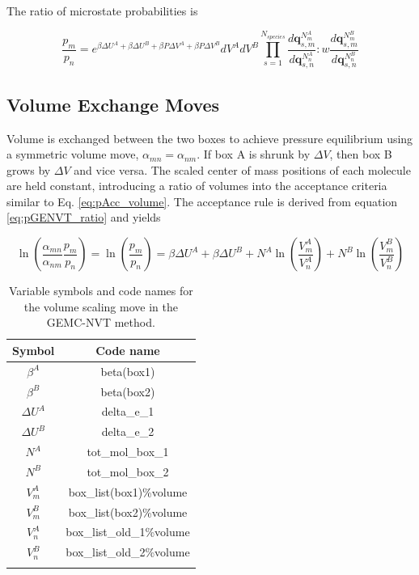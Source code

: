 The ratio of microstate probabilities is

\begin{equation}
\frac{p_m}{p_n} = e^{\beta \Delta U^A + \beta \Delta U^B + \beta P \Delta V^A + \beta P \Delta V^B} dV^A dV^B
                  \prod_{s=1}^{N_{species}} \frac{d\mathbf{q}_{s,m}^{N^A_m}}{d\mathbf{q}_{s,n}^{N^A_n}}
                   :w
                         \frac{d\mathbf{q}_{s,m}^{N^B_m}}{d\mathbf{q}_{s,n}^{N^B_n}}
\label{eq:pGENPT_ratio}
\end{equation}

\subsection{Volume Exchange Moves} 
\label{sec:vol_swap}

Volume is exchanged between the two boxes to achieve pressure equilibrium using a symmetric volume move, $\alpha_{mn} = \alpha_{nm}$.
If box A is shrunk by $\Delta V$, then box B grows by $\Delta V$ and vice versa.
The scaled center of mass positions of each molecule are held constant, 
introducing a ratio of volumes into the acceptance criteria similar to Eq. \ref{eq:pAcc_volume}.
The acceptance rule is derived from equation \ref{eq:pGENVT_ratio} and yields

\begin{equation}
\ln \left( \frac{\alpha_{mn}}{\alpha_{nm}} \frac{p_m}{p_n} \right) = \ln \left( \frac{p_m}{p_n} \right) = \beta \Delta U^A + \beta \Delta U^B + N^A \ln\left(\frac{V^A_m}{V^A_n}\right) + N^B \ln\left(\frac{V^B_m}{V^B_n}\right)
\label{eq:pAcc_vol_swap}
\end{equation}

\begin{table}
\caption{Variable symbols and code names for the volume scaling move in the GEMC-NVT method.}
\label{table:gemc_nvt_volume}
\centering
\begin{tabular}{|c|c|} \hline
 {\bf Symbol} & {\bf Code name} \\ \hline
 $\beta^A$ & beta(box1) \\
 $\beta^B$ & beta(box2) \\
 $\Delta U^A$ & delta\_e\_1 \\
 $\Delta U^B$ & delta\_e\_2 \\
 $N^A$ & tot\_mol\_box\_1 \\
 $N^B$ & tot\_mol\_box\_2 \\
 $V^A_m$ & box\_list(box1)\%volume \\
 $V^B_m$ & box\_list(box2)\%volume \\
 $V^A_n$ & box\_list\_old\_1\%volume \\
 $V^B_n$ & box\_list\_old\_2\%volume \\
 \hline
\multicolumn{2}{c}{}
\end{tabular}
\end{table}




